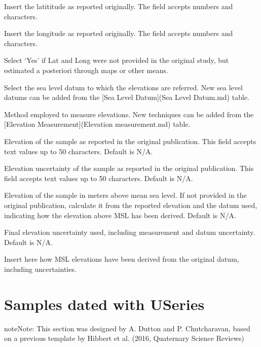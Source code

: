 \documentclass[letterpaper,10pt,english]{sphinxmanual}
\begin{document}
 \sphinxhyphen{} Insert the latititude as reported originally. The field accepts numbers and characters.

 \sphinxhyphen{} Insert the longitude as reported originally. The field accepts numbers and characters.

 \sphinxhyphen{} Select ‘Yes’ if Lat and Long were not provided in the original study, but estimated a posteriori through maps or other means.

 \sphinxhyphen{} Select the sea level datum to which the elevations are referred. New sea level datums can be added from the {[}Sea Level Datum{]}(Sea Level Datum.md) table.

 \sphinxhyphen{} Method employed to measure elevations. New techniques can be added from the {[}Elevation Measurement{]}(Elevation measurement.md) table.

 \sphinxhyphen{} Elevation of the sample as reported in the original publication. This field accepts text values up to 50 characters. Default is N/A.

 \sphinxhyphen{} Elevation uncertainty of the sample as reported in the original publication. This field accepts text values up to 50 characters. Default is N/A.

 \sphinxhyphen{} Elevation of the sample in meters above mean sea level. If not provided in the original publication, calculate it from the reported elevation and the datum used, indicating how the elevation above MSL has been derived. Default is N/A.

 \sphinxhyphen{} Final elevation uncertainty used, including measurement and datum uncertainty. Default is N/A.

 \sphinxhyphen{} Insert here how MSL elevations have been derived from the original datum, including uncertainties.


\chapter{Samples dated with U\sphinxhyphen{}Series}
\label{\detokenize{Useries:samples-dated-with-u-series}}\label{\detokenize{Useries::doc}}
\begin{sphinxadmonition}{note}{Note:}
This section was designed by A. Dutton and P. Chutcharavan, based on a previous template by Hibbert et al. (2016, Quaternary Science Reviews)
\end{sphinxadmonition}
\end{document}
